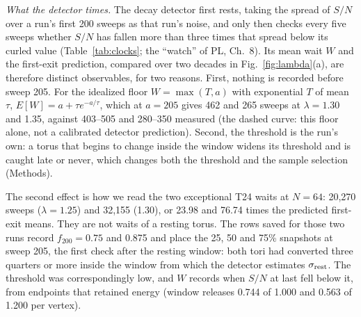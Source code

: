 \documentclass[aps,pre,10pt,twocolumn,superscriptaddress,nofootinbib]{revtex4-2}
\begin{document}
\emph{What the detector times.} The decay detector first rests,
taking the spread of $S/N$ over a run's first 200 sweeps as that run's noise, and only then checks
every five sweeps whether $S/N$ has fallen more than three times that spread below its curled value
(Table~\ref{tab:clocks}; the ``watch'' of PL, Ch.~8). Its mean wait $W$ and the first-exit
prediction, compared over two decades in Fig.~\ref{fig:lambda}(a), are therefore distinct
observables, for two reasons. First, nothing is recorded before sweep 205. For the idealized floor
$W=\max(T,a)$ with exponential $T$ of mean $\tau$, $E[W]=a+\tau e^{-a/\tau}$, which at $a=205$ gives
462 and 265 sweeps at $\lambda=1.30$ and 1.35, against 403--505 and 280--350 measured (the dashed
curve: this floor alone, not a calibrated detector prediction). Second, the threshold is the run's own: a torus that begins
to change inside the window widens its threshold and is caught late or never, which changes both the
threshold and the sample selection (Methods).

The second effect is how we read the two exceptional T24 waits at $N=64$: 20,270 sweeps
($\lambda=1.25$) and 32,155 (1.30), or 23.98 and 76.74 times the predicted first-exit means. They are
not waits of a resting torus. The rows saved for those two runs record $f_{200}=0.75$ and 0.875 and
place the 25, 50 and 75\% snapshots at sweep 205, the first check after the resting window: both tori
had converted three quarters or more inside the window from which the detector estimates
$\sigma_{\rm rest}$. The threshold was correspondingly low, and $W$ records when $S/N$ at last fell
below it, from endpoints that retained energy (window releases 0.744 of 1.000 and 0.563 of 1.200 per
vertex).
\end{document}
